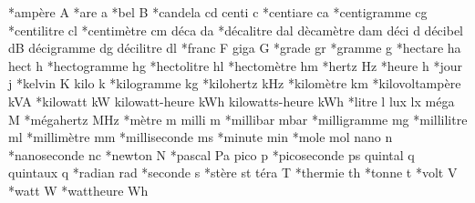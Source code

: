 *amp\`{e}re             A%
*are                a%
*bel                B%
*candela            cd%
centi               c%
*centiare           ca%
*centigramme        cg%
*centilitre         cl%
*centim\`{e}tre         cm%
d\'{e}ca                da%
*d\'{e}calitre          dal%
d\`{e}cam\`{e}tre           dam%
d\'{e}ci                d%
d\'{e}cibel             dB%
d\'{e}cigramme             dg%
d\'{e}cilitre             dl%
*franc              F%
giga                G%
*grade              gr%
*gramme             g%
*hectare            ha%
hect                h%
*hectogramme        hg%
*hectolitre         hl%
*hectom\`{e}tre         hm%
*hertz              Hz%
*heure              h%
*jour               j%
*kelvin             K%
kilo                k%
*kilogramme         kg%
*kilohertz          kHz%
*kilom\`{e}tre          km%
*kilovoltamp\`{e}re        kVA%
*kilowatt           kW%
kilowatt-heure      kWh%
kilowatts-heure     kWh%
*litre              l%
lux                 lx%
m\'{e}ga              M%
*m\'{e}gahertz          MHz%
*m\`{e}tre              m%
milli               m%
*millibar           mbar%
*milligramme        mg%
*millilitre         ml%
*millim\`{e}tre         mm%
*milliseconde        ms%
*minute             min%
*mole               mol%
nano                n%
*nanoseconde        nc%
*newton             N%
*pascal             Pa%
pico                p%
*picoseconde        ps%
quintal             q%
quintaux            q%
*radian             rad%
*seconde            s%
*st\`{e}re              st%
t\'{e}ra              T%
*thermie            th%
*tonne              t%
*volt               V%
*watt               W%
*wattheure          Wh%

